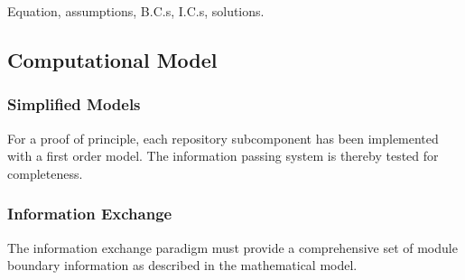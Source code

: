 Equation, assumptions, B.C.s, I.C.s, solutions.

\subsection{Computational Model}

\subsubsection{Simplified Models}
For a proof of principle, each repository subcomponent has been 
implemented with a first order model. The information passing system 
is thereby tested for completeness. 

\subsubsection{Information Exchange}
The information exchange paradigm must provide a comprehensive set of 
module boundary information as described in the mathematical model.
